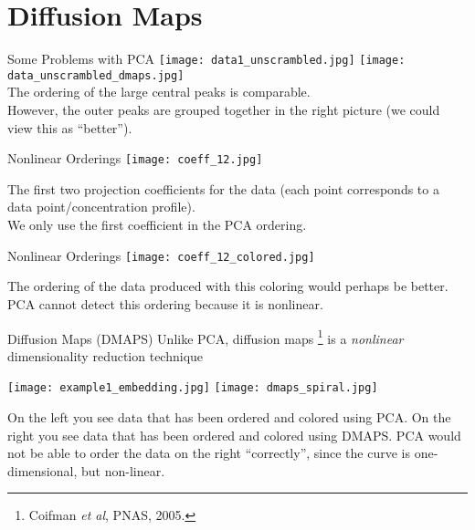 \documentclass{beamer}
\begin{document}
\section{Diffusion Maps}

\begin{frame}{Some Problems with PCA}
    \centering
    \texttt{[image: data1\_unscrambled.jpg]}
    \texttt{[image: data\_unscrambled\_dmaps.jpg]}\\
    The ordering of the large central peaks is comparable.\\
    However, the outer peaks are grouped together in the right picture (we could view this as ``better'').

\end{frame}

\begin{frame}{Nonlinear Orderings}
    \centering
    \texttt{[image: coeff\_12.jpg]}

    The first two projection coefficients for the data (each point corresponds to a data point/concentration profile). \\
    We only use the first coefficient in the PCA ordering.

\end{frame}

\begin{frame}{Nonlinear Orderings}
    \centering
    \texttt{[image: coeff\_12\_colored.jpg]}

    The ordering of the data produced with this coloring would perhaps be better. \\
    PCA cannot detect this ordering because it is nonlinear.

\end{frame}

\begin{frame}{Diffusion Maps (DMAPS)}
\centering
Unlike PCA, diffusion maps \footnote{ \tiny Coifman {\em et al}, PNAS, 2005.} is a {\em nonlinear} dimensionality reduction technique

    \texttt{[image: example1\_embedding.jpg]}
    \texttt{[image: dmaps\_spiral.jpg]}

On the left you see data that has been ordered and colored using PCA.
On the right you see data that has been ordered and colored using DMAPS.
PCA would not be able to order the data on the right ``correctly'', since the curve is one-dimensional, but non-linear.

\end{frame}
\end{document}
